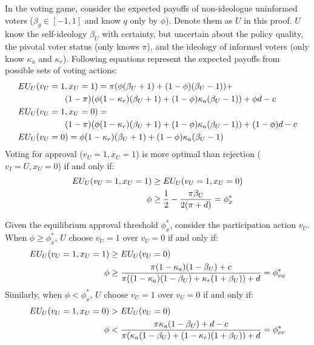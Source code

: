 \par In the voting game, consider the expected payoffs of non-ideologue uninformed voters ($\beta_g \in [-1,1]$ and know $q$ only by $\phi$). Denote them as $U$ in this proof. $U$ know the self-ideology $\beta_U$ with certainty, but uncertain about the policy quality, the pivotal voter status (only knows $\pi$), and the ideology of informed voters (only know $\kappa_a$ and $\kappa_r$). Following equations represent the expected payoffs from possible sets of voting actions:
\begin{align*}
EU_U(v_U=1&, x_U=1) = 
\pi (\phi (\beta_U + 1) + (1-\phi) (\beta_U - 1)) + \\
&(1-\pi) (\phi (1-\kappa_{r}) (\beta_U + 1) + (1-\phi) \kappa_{a} (\beta_U - 1)) + \phi d - c \\
EU_U(v_U=1& ,x_U=0) = \notag \\
&(1-\pi) (\phi (1-\kappa_{r}) (\beta_U+1) + (1-\phi) \kappa_{a} (\beta_U - 1))+ (1-\phi) d - c \\
EU_U(v_U=0&) = \phi (1-\kappa_{r}) (\beta_U+1) + (1-\phi) \kappa_{a} (\beta_U - 1)
\end{align*}
\noindent Voting for approval ($v_U=1,x_U=1$) is more optimal than rejection ($v_I=U,x_U=0$) if and only if:
\begin{align*}
EU_U(v_U=1, x_U=1) &\geq EU_U(v_U=1, x_U=0) \notag \\
\phi &\geq \frac{1}{2} - \frac{\pi \beta_U}{2(\pi + d)} = \phi^*_x
\end{align*}

\par Given the equilibrium approval threshold $\phi^*_x$, consider the participation action $v_U$. When $\phi \geq \phi^*_x$, $U$ choose $v_U=1$ over $v_U=0$ if and only if:
\begin{align*}
EU_U(v_U=1, x_U=1) &\geq EU_U(v_U=0) \notag \\
\phi &\geq \frac{\pi (1- \kappa_{a}) (1-\beta_U) + c}{\pi ((1 - \kappa_{a}) (1-\beta_U) + \kappa_{r} (1+\beta_U)) + d} = \phi^*_{va} 
\end{align*}
\noindent Similarly, when $\phi < \phi^*_x$, $U$ choose $v_U=1$ over $v_U=0$ if and only if: 
\begin{align*}
EU_U(v_U=1, x_U=0) &> EU_U(v_U=0) \notag \\
\phi &< \frac{\pi \kappa_{a} (1-\beta_U) + d - c}{\pi ( \kappa_{a} (1-\beta_U) + (1-\kappa_{r}) (1+\beta_U) ) + d} = \phi^*_{vr} 
\end{align*}

